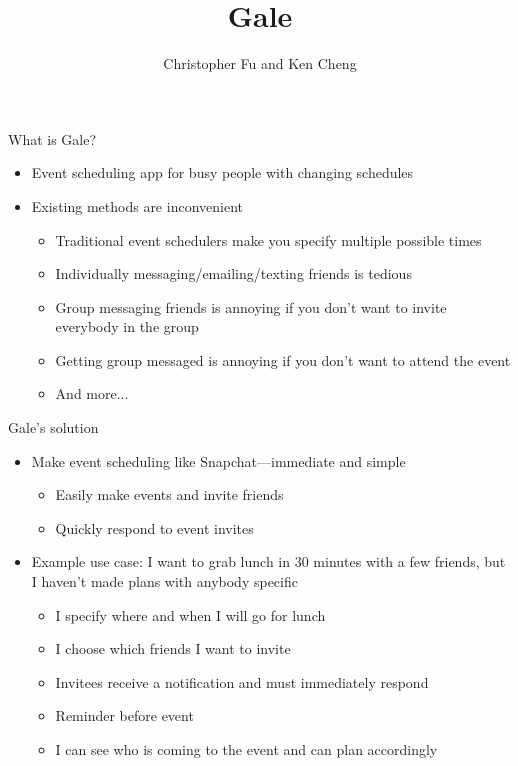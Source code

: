 \documentclass[pdf]{beamer}
\title{Gale}
\author{Christopher Fu and Ken Cheng}
\begin{document}
\begin{frame}
    \titlepage
\end{frame}

\begin{frame}{What is Gale?}
\begin{itemize}
    \item Event scheduling app for busy people with changing schedules
    \item Existing methods are inconvenient
    \begin{itemize}
        \item Traditional event schedulers make you specify multiple
        possible times
        \item Individually messaging/emailing/texting friends is tedious
        \item Group messaging friends is annoying if you don't want to
        invite everybody in the group
        \item Getting group messaged is annoying if you don't want to attend
        the event
        \item And more...
    \end{itemize}
\end{itemize}
\end{frame}

\begin{frame}{Gale's solution}
\begin{itemize}
    \item Make event scheduling like Snapchat---immediate and simple
    \begin{itemize}
        \item Easily make events and invite friends
        \item Quickly respond to event invites
    \end{itemize}
    \item Example use case: I want to grab lunch in 30 minutes with a few
    friends, but I haven't made plans with anybody specific
    \begin{itemize}
        \item I specify where and when I will go for lunch
        \item I choose which friends I want to invite
        \item Invitees receive a notification and must immediately respond
        \item Reminder before event
        \item I can see who is coming to the event and can plan accordingly
    \end{itemize}
\end{itemize}
\end{frame}
\end{document}
